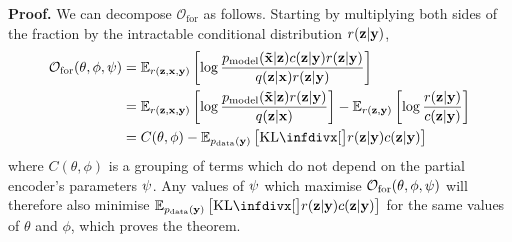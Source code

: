 \textbf{Proof.} We can decompose $\mathcal{O}_\mathrm{for}$ as follows.
Starting by multiplying both sides of the fraction by the intractable
conditional distribution $r(\mathbf{z}{}|\mathbf{y}{})$,
\begin{align}
  \mathcal{O}_\mathrm{for}(\theta, \phi, \partphi{}) &= \EX_{r(\z{},\I{},\partI{})} \left[ \log \frac{\pmodel{}(\tildeI{}|\z{})\partq{}(\z{}|\partI{})r(\z{}|\partI{})}{q(\z{}|\I{})r(\z{}|\partI{})} \right]\\
                                                   &= \EX_{r(\z{},\I{},\partI{})} \left[ \log \frac{\pmodel{}(\tildeI{}|\z{})r(\z{}|\partI{})}{q(\z{}|\I{})} \right] - \EX_{r(\z{},\partI{})} \left[ \log\frac{r(\z{}|\partI{})}{\partq{}(\z{}|\partI{})} \right] \\
                                                   &= C(\theta, \phi) - \EX_{\pdata{}(\partI{})} \left[ \kl[\big]{ r(\z{}|\partI{}) }{ \partq{}(\z{}|\partI{}) } \right]   \label{eq:constant-and-forward-kl}
\end{align}
where $C(\theta, \phi)$ is a grouping of terms which do not depend on the
partial encoder's parameters $\psi{}$. Any values of $\psi{}$ which
maximise $\mathcal{O}_\mathrm{for}(\theta, \phi, \psi{})$ will therefore also
minimise $\EX_{\pdata{}(\partI{})} \left[ \kl[\big]{ r(\z{}|\partI{}) }{
    \partq{}(\z{}|\partI{}) } \right]$ for the same values of $\theta$ and $\phi$,
which proves the theorem.

